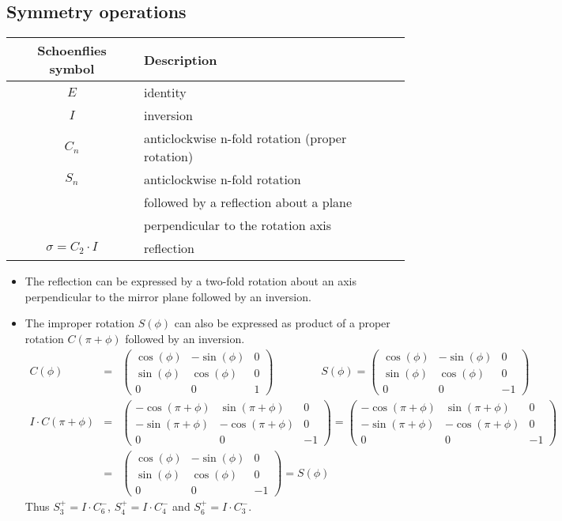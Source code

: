 \documentclass[11pt,a4paper]{report}
\begin{document}
\subsection{Symmetry operations}
\begin{center}
\begin{tabular}{|c|l|}
\hline
Schoenflies symbol &  Description\\
\hline
$E$ & identity \\
$I$ & inversion \\
$C_n$ & anticlockwise n-fold rotation (proper rotation)\\
$S_n$ & anticlockwise n-fold rotation\\
    & followed by a reflection about a plane \\
    & perpendicular to the rotation axis\\
$\sigma=C_2\cdot I$ & reflection\\
\hline
\end{tabular}
\end{center}
\begin{itemize}
\item The reflection can be expressed by a two-fold rotation about an axis
perpendicular to the mirror plane followed by an inversion.
%
\item The improper rotation $S(\phi)$ can also be expressed as product of a
proper rotation $C(\pi+\phi)$ followed by an inversion.
\begin{eqnarray}
C(\phi)&=&\left(\begin{array}{ccc}
\cos(\phi)& -\sin(\phi) & 0\\
\sin(\phi)& \cos(\phi) & 0\\
0& 0& 1\end{array}\right)
\qquad\;\qquad
S(\phi)=\left(\begin{array}{ccc}
\cos(\phi)& -\sin(\phi) & 0\\
\sin(\phi)& \cos(\phi) & 0\\
0& 0& -1\end{array}\right)
\nonumber\\
I\cdot C(\pi+\phi)
&=&\left(\begin{array}{ccc}
-\cos(\pi+\phi)& \sin(\pi+\phi) & 0\\
-\sin(\pi+\phi)& -\cos(\pi+\phi) & 0\\
0& 0& -1\end{array}\right)
=\left(\begin{array}{ccc}
-\cos(\pi+\phi)& \sin(\pi+\phi) & 0\\
-\sin(\pi+\phi)& -\cos(\pi+\phi) & 0\\
0& 0& -1\end{array}\right)
\nonumber\\
&=&\left(\begin{array}{ccc}
\cos(\phi)& -\sin(\phi) & 0\\
\sin(\phi)& \cos(\phi) & 0\\
0& 0& -1\end{array}\right)
=S(\phi)
\end{eqnarray}
Thus $S_3^+=I\cdot C_6^-$, $S_4^+=I\cdot C_4^-$ and $S_6^+=I\cdot C_3^-$. 
\end{itemize}
\end{document}
